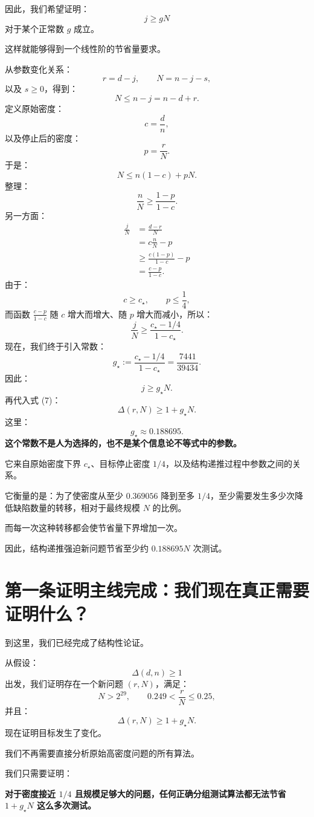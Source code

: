 \documentclass[UTF8,11pt]{ctexart}
\begin{document}
因此，我们希望证明：
\[j\ge gN\]
对于某个正常数 $g$ 成立。

这样就能够得到一个线性阶的节省量要求。

从参数变化关系：
\[r=d-j,\qquad N=n-j-s,\]
以及 $s\ge0$，得到：
\[N\le n-j=n-d+r.\]
定义原始密度：
\[c=\frac dn,\]
以及停止后的密度：
\[p=\frac rN.\]
于是：
\[N\le n(1-c)+pN.\]
整理：
\[\frac nN\ge\frac{1-p}{1-c}.\]
另一方面：
\[
\begin{aligned}
\frac jN&=\frac{d-r}{N}\\
&=c\frac nN-p\\
&\ge\frac{c(1-p)}{1-c}-p\\
&=\frac{c-p}{1-c}.
\end{aligned}
\]
由于：
\[c\ge c_\star,\qquad p\le\frac14,\]
而函数 $\frac{c-p}{1-c}$ 随 $c$ 增大而增大、随 $p$ 增大而减小，所以：
\[\frac jN\ge\frac{c_\star-1/4}{1-c_\star}.\]
现在，我们终于引入常数：
\begin{equation}\boxed{g_\star:=\frac{c_\star-1/4}{1-c_\star}=\frac{7441}{39434}.}\tag{10}\end{equation}
因此：
\[j\ge g_\star N.\]
再代入式 (7)：
\begin{equation}\boxed{\Delta(r,N)\ge1+g_\star N.}\tag{11}\end{equation}
这里：
\[g_\star\approx0.188695.\]
\textbf{这个常数不是人为选择的，也不是某个信息论不等式中的参数。}

它来自原始密度下界 $c_\star$、目标停止密度 $1/4$，以及结构递推过程中参数之间的关系。

它衡量的是：为了使密度从至少 $0.369056$ 降到至多 $1/4$，至少需要发生多少次降低缺陷数量的转移，相对于最终规模 $N$ 的比例。

而每一次这种转移都会使节省量下界增加一次。

因此，结构递推强迫新问题节省至少约 $0.188695N$ 次测试。

\section{第一条证明主线完成：我们现在真正需要证明什么？}
到这里，我们已经完成了结构性论证。

从假设：
\[\Delta(d,n)\ge1\]
出发，我们证明存在一个新问题 $(r,N)$，满足：
\[\boxed{N>2^{29},\qquad0.249<\frac rN\le0.25,}\]
并且：
\[\boxed{\Delta(r,N)\ge1+g_\star N.}\]
现在证明目标发生了变化。

我们不再需要直接分析原始高密度问题的所有算法。

我们只需要证明：

\textbf{对于密度接近 $1/4$ 且规模足够大的问题，任何正确分组测试算法都无法节省 $1+g_\star N$ 这么多次测试。}
\end{document}
